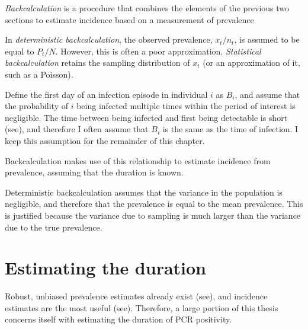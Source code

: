 \documentclass[thesis.tex]{subfiles}
\begin{document}
\emph{Backcalculation} is a procedure that combines the elements of the previous two sections to estimate incidence based on a measurement of prevalence

In \emph{deterministic backcalculation}, the observed prevalence, $x_t/n_t$, is assumed to be equal to $P_t/N$.
However, this is often a poor approximation.
\emph{Statistical backcalculation} retains the sampling distribution of $x_t$ (or an approximation of it, such as a Poisson).

Define the first day of an infection episode in individual $i$ as $B_i$, and assume that the probability of $i$ being infected multiple times within the period of interest is negligible.
The time between being infected and first being detectable is short (see), and therefore I often assume that $B_i$ is the same as the time of infection.
I keep this assumption for the remainder of this chapter.


Backcalculation makes use of this relationship to estimate incidence from prevalence, assuming that the duration is known.

Deterministic backcalculation assumes that the variance in the population is negligible, and therefore that the prevalence is equal to the mean prevalence.
This is justified because the variance due to sampling is much larger than the variance due to the true prevalence.


\section{Estimating the duration} \label{inprev:sec:duration}

Robust, unbiased prevalence estimates already exist (see), and incidence estimates are the most useful (see).
Therefore, a large portion of this thesis concerns itself with estimating the duration of PCR positivity.
\end{document}
